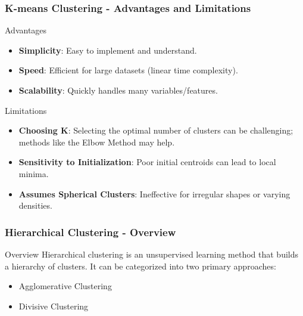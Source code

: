 \documentclass[aspectratio=169]{beamer}
\begin{document}
\begin{frame}[fragile]
    \frametitle{K-means Clustering - Advantages and Limitations}
    \begin{block}{Advantages}
        \begin{itemize}
            \item \textbf{Simplicity}: Easy to implement and understand.
            \item \textbf{Speed}: Efficient for large datasets (linear time complexity).
            \item \textbf{Scalability}: Quickly handles many variables/features.
        \end{itemize}
    \end{block}

    \begin{block}{Limitations}
        \begin{itemize}
            \item \textbf{Choosing K}: Selecting the optimal number of clusters can be challenging; methods like the Elbow Method may help.
            \item \textbf{Sensitivity to Initialization}: Poor initial centroids can lead to local minima.
            \item \textbf{Assumes Spherical Clusters}: Ineffective for irregular shapes or varying densities.
        \end{itemize}
    \end{block}
\end{frame}

\begin{frame}[fragile]
    \frametitle{Hierarchical Clustering - Overview}
    \begin{block}{Overview}
        Hierarchical clustering is an unsupervised learning method that builds a hierarchy of clusters. It can be categorized into two primary approaches: 
    \end{block}
    \begin{itemize}
        \item Agglomerative Clustering
        \item Divisive Clustering
    \end{itemize}
\end{frame}
\end{document}
